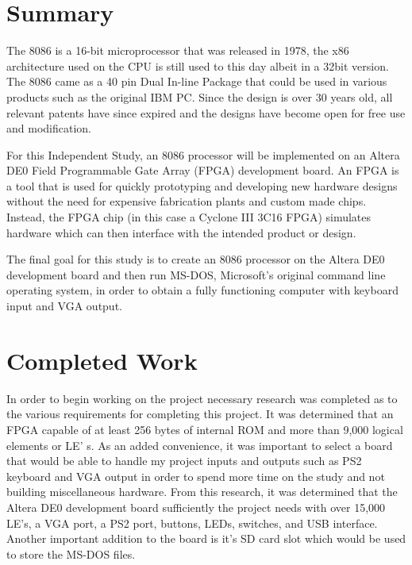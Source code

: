 \documentclass[twoside]{article}
\begin{document}


\thispagestyle{fancy} %



\section{Summary}

The 8086 is a 16-bit microprocessor that was released in 1978, the x86 architecture used on the CPU is still used to this day albeit in a 32bit version. The 8086 came as a 40 pin Dual In-line Package that could be used in various products such as the original IBM PC. Since the design is over 30 years old, all relevant patents have since expired and the designs have become open for free use and modification. 

For this Independent Study, an 8086 processor will be implemented on an Altera DE0 Field Programmable Gate Array (FPGA) development board. An FPGA is a tool that is used for quickly prototyping and developing new hardware designs without the need for expensive fabrication plants and custom made chips. Instead, the FPGA chip (in this case a Cyclone III 3C16 FPGA) simulates hardware which can then interface with the intended product or design.

The final goal for this study is to create an 8086 processor on the Altera DE0 development board and then run MS-DOS, Microsoft's original command line operating system, in order to obtain a fully functioning computer with keyboard input and VGA output.




\section{Completed Work}

In order to begin working on the project necessary research was completed as to the various requirements for completing this project. It was determined that an FPGA capable of at least 256 bytes of internal ROM and more than 9,000 logical elements or LE' s. As an added convenience, it was important to select a board that would be able to handle my project inputs and outputs such as PS2 keyboard and VGA output in order to spend more time on the study and not building miscellaneous hardware.  From this research, it was determined that the Altera DE0 development board sufficiently the project needs with over 15,000 LE's, a VGA port, a PS2 port, buttons, LEDs, switches, and USB interface. Another important addition to the board is it's SD card slot which would be used to store the MS-DOS files.
\end{document}
